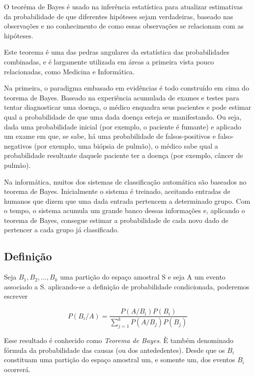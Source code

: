 O teoréma de Bayes é usado na inferência estatística para
atualizar estimativas da probabilidade de que diferentes hipóteses
sejam verdadeiras, baseado nas observações e no conhecimento de
como essas observações se relacionam com as hipóteses.\vskip0.3cm

Este teorema é uma das pedras angulares da estatística das
probabilidades combinadas, e é largamente utilizada em áreas a
primeira vista pouco relacionadas, como Medicina e
Informática.\vskip0.3cm

Na primeira, o paradigma embasado em evidências é todo construído
em cima do teorema de Bayes. Baseado na experiência acumulada de
exames e testes para tentar diagnosticar uma doença, o médico
enquadra seus pacientes e pode estimar qual a probabilidade de que
uma dada doença esteja se manifestando. Ou seja, dada uma
probabilidade inicial (por exemplo, o paciente é fumante) e
aplicado um exame em que, se sabe, há uma probabilidade de
falsos-positivos e falso-negativos (por exemplo, uma biópsia de
pulmão), o médico sabe qual a probabilidade resultante daquele
paciente ter a doença (por exemplo, câncer de pulmão).\vskip0.3cm

Na informática, muitos dos sistemas de classificação automática
são baseados no teorema de Bayes. Inicialmente o sistema é
treinado, aceitando entradas de humanos que dizem que uma dada
entrada pertencem a determinado grupo. Com o tempo, o sistema
acumula um grande banco dessas informações e, aplicando o teorema
de Bayes, consegue estimar a probabilidade de cada novo dado de
pertencer a cada grupo já classificado.\vskip0.3cm


\subsection{Definição}

Seja $B_{1},B_{2},...,B_{k}$ uma partição do espaço amostral S e
seja A um evento associado a S. aplicando-se a definição de
probabilidade condicionada, poderemos escrever


\begin{equation}\label{bayes}
    P(B_{i}/A)=\frac{P(A/B_{i})P(B_{i})}{\sum_{j=1}^{k}P(A/B_{j})P(B_{j})}
\end{equation}


Esse resultado é conhecido como \emph{Teorema de Bayes}. È também
denominado fórmula da probabilidade das causas (ou dos
antededentes). Desde que os $B_{i}$ constituam uma partição do
espaço amostral um, e somente um, dos eventos $B_{i}$ ocorrerá.

